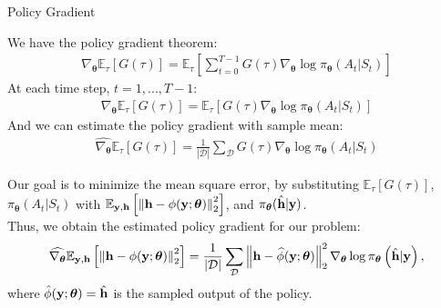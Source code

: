 \documentclass[hyperref={bookmarks=false}]{beamer}
\numberwithin{figure}{section}
\begin{document}
\begin{frame}[allowframebreaks]{Policy Gradient}

We have the policy gradient theorem:
\begin{align*}
    \nabla_{\boldsymbol{\theta}}\mathbb{E}_{\tau}[G(\tau)]
        =\mathbb{E}_{\tau}\left[\sum\limits_{t=0}^{T-1}G(\tau)
        \nabla_{\boldsymbol{\theta}}\log{\pi_{\boldsymbol{\theta}}
        (A_t|S_t)}\right]
\end{align*}
At each time step, $t=1,...,T-1$:
\begin{align*}
    \nabla_{\boldsymbol{\theta}}\mathbb{E}_{\tau}[G(\tau)]
        =\mathbb{E}_{\tau}\left[G(\tau)
        \nabla_{\boldsymbol{\theta}}\log{\pi_{\boldsymbol{\theta}}
        (A_t|S_t)}\right]
\end{align*}
And we can estimate the policy gradient with sample mean:
\begin{align*}
    \widehat{\nabla_{\boldsymbol{\theta}}}\mathbb{E}_{\tau}[G(\tau)]
        =\frac{1}{\left| \mathcal{D}  \right|} \sum\limits_{\mathcal{D}}
        G(\tau)\nabla_{\boldsymbol{\theta}}\log{\pi_{\boldsymbol{\theta}}
        (A_t|S_t)}
\end{align*}

\framebreak

Our goal is to minimize the mean square error, by substituting 
$\mathbb{E}_{\tau}[G(\tau)]$, $\pi_{\boldsymbol{\theta}}(A_t|S_t)$ with 
$\mathbb{E}_{{\bf y},{\bf h}}\left[\left\| {\bf h}-\phi(\mathbf{y};\boldsymbol{\theta}) \right\|^2_2 \right]$,
and $\pi_{\boldsymbol{\theta}}(\hat{{\bf h}}|{\bf y})$.\\
Thus, we obtain the estimated policy gradient for our problem:
\begin{align*}
    \widehat{\nabla_{\boldsymbol{\theta}}}
            \mathbb{E}_{{\bf y},{\bf h}}\left[\left\| {\bf h}-\phi(\mathbf{y};\boldsymbol{\theta}) \right\|^2_2 \right]
            = \frac{1}{\left| \mathcal{D}  \right|} \sum\limits_{\mathcal{D}}
            \left\| {\bf h}-\widehat{\phi}(\mathbf{y};\boldsymbol{\theta}) \right\|^2_2
            \nabla_{\boldsymbol{\theta}}
            \log \pi_{\boldsymbol{\theta}}
            \left( \hat{{\bf h}}|{\bf y} \right),
\end{align*}
where $\hat{\phi}(\mathbf{y};\boldsymbol{\theta}) = 
\hat{{\bf h}}$ is the sampled output of the policy. 

\end{frame}
\end{document}
